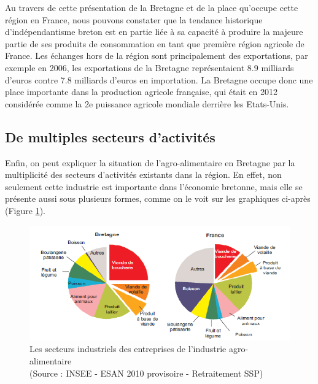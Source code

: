 \documentclass[a4paper,12pt]{report}
\begin{document}
			Au travers de cette présentation de la Bretagne et de la place qu’occupe cette région en France, nous pouvons constater que la tendance historique d’indépendantisme breton est en partie liée à sa capacité à produire la majeure partie de ses produits de consommation en tant que première région agricole de France. Les échanges hors de la région sont principalement des exportations, par exemple en 2006, les exportations de la Bretagne représentaient 8.9 milliards d’euros contre 7.8 milliards d’euros en importation. La Bretagne occupe donc une place importante dans la production agricole française, qui était en 2012 considérée comme la 2e puissance agricole mondiale derrière les Etats-Unis.
			
		\subsection{De multiples secteurs d'activités}
			Enfin, on peut expliquer la situation de l'agro-alimentaire en Bretagne par la multiplicité des secteurs d'activités existants dans la région. En effet, non seulement cette industrie est importante dans l'économie bretonne, mais elle se présente aussi sous plusieurs formes, comme on le voit sur les graphiques ci-après (Figure \ref{SecteursIndustrielsIAA}).
			
			\begin{figure}[!h]
			\centering
			\includegraphics[scale=1]{Illustrations/SecteursIndustrielsIAA.png}
			\caption{Les secteurs industriels des entreprises de l'industrie agro-alimentaire\\(Source : INSEE - ESAN 2010 provisoire - Retraitement SSP)}
			\label{SecteursIndustrielsIAA}
			\end{figure}
			
\end{document}
